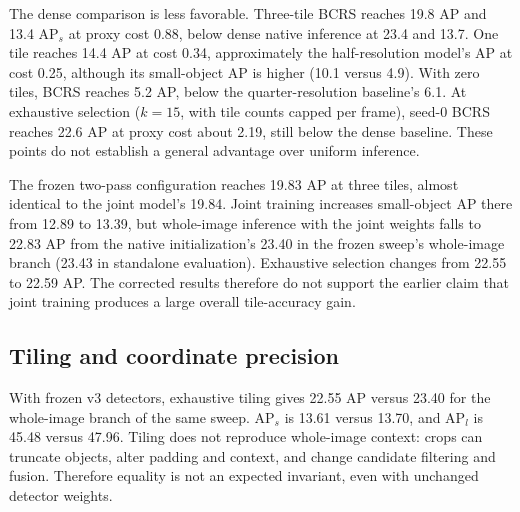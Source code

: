 \documentclass[conference]{IEEEtran}
\begin{document}
The dense comparison is less favorable. Three-tile BCRS reaches 19.8 AP and 13.4 AP$_s$ at proxy cost 0.88, below dense native inference at 23.4 and 13.7. One tile reaches 14.4 AP at cost 0.34, approximately the half-resolution model's AP at cost 0.25, although its small-object AP is higher (10.1 versus 4.9). With zero tiles, BCRS reaches 5.2 AP, below the quarter-resolution baseline's 6.1. At exhaustive selection ($k=15$, with tile counts capped per frame), seed-0 BCRS reaches 22.6 AP at proxy cost about 2.19, still below the dense baseline. These points do not establish a general advantage over uniform inference.

The frozen two-pass configuration reaches 19.83 AP at three tiles, almost identical to the joint model's 19.84. Joint training increases small-object AP there from 12.89 to 13.39, but whole-image inference with the joint weights falls to 22.83 AP from the native initialization's 23.40 in the frozen sweep's whole-image branch (23.43 in standalone evaluation). Exhaustive selection changes from 22.55 to 22.59 AP. The corrected results therefore do not support the earlier claim that joint training produces a large overall tile-accuracy gain.

\subsection{Tiling and coordinate precision}
\label{sec:fusion}
With frozen v3 detectors, exhaustive tiling gives 22.55 AP versus 23.40 for the whole-image branch of the same sweep. AP$_s$ is 13.61 versus 13.70, and AP$_l$ is 45.48 versus 47.96. Tiling does not reproduce whole-image context: crops can truncate objects, alter padding and context, and change candidate filtering and fusion. Therefore equality is not an expected invariant, even with unchanged detector weights.
\end{document}

